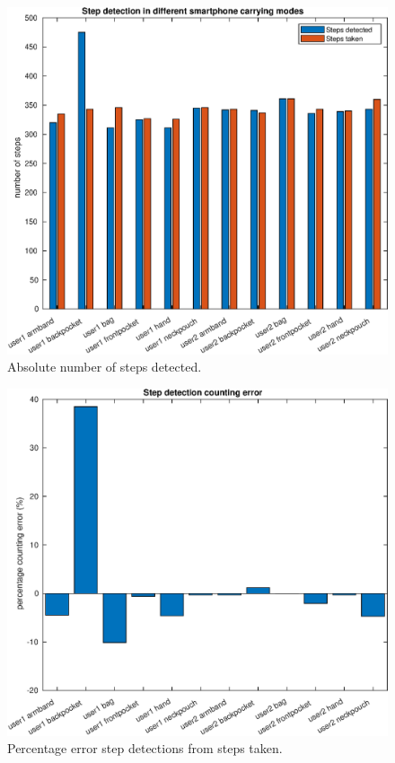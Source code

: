 	\begin{figure}[htbp]
		\centering
		\includegraphics[width=0.7\linewidth]{images/20201127_1516_Step_detection_in_different_smartphone_carrying_modes}
		\setlength{\belowcaptionskip}{-10pt}
		\caption{Absolute number of steps detected.}
		\label{fig:sd_abs_comparison}
	\end{figure}
	\begin{figure}[H]
		\centering
		\includegraphics[width=0.7\linewidth]{images/20201127_1520_Step_detection_counting_error}
		\caption{Percentage error step detections from steps taken. }
		\label{fig:sd_percent_comparison}
	\end{figure}


